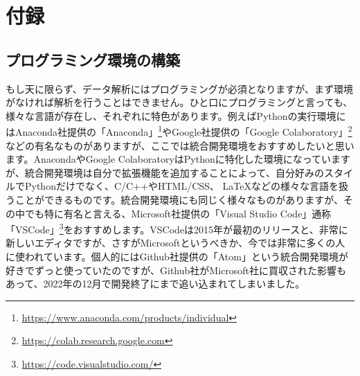 \chapter*{付録}
\label{chap:appendix}

\setcounter{section}{0} %
\renewcommand{\thesection}{\Alph{section}} %
\setcounter{equation}{0} %
\renewcommand{\theequation}{\Alph{section}.\arabic{equation}}
\setcounter{figure}{0} %
\renewcommand{\thefigure}{\Alph{section}.\arabic{figure}}
\setcounter{table}{0} %
\renewcommand{\thetable}{\Alph{section}.\arabic{table}}

\section{プログラミング環境の構築}
もし天に限らず、データ解析にはプログラミングが必須となりますが、まず環境がなければ解析を行うことはできません。ひと口にプログラミングと言っても、様々な言語が存在し、それぞれに特色があります。例えばPythonの実行環境にはAnaconda社提供の「Anaconda」\footnote{\url{https://www.anaconda.com/products/individual}}やGoogle社提供の「Google Colaboratory」\footnote{\url{https://colab.research.google.com}}などの有名なものがありますが、ここでは統合開発環境をおすすめしたいと思います。AnacondaやGoogle ColaboratoryはPythonに特化した環境になっていますが、統合開発環境は自分で拡張機能を追加することによって、自分好みのスタイルでPythonだけでなく、C/C++やHTML/CSS、 \LaTeX などの様々な言語を扱うことができるものです。統合開発環境にも同じく様々なものがありますが、その中でも特に有名と言える、Microsoft社提供の「Visual Studio Code」通称「VSCode」\footnote{\url{https://code.visualstudio.com/}}をおすすめします。VSCodeは2015年が最初のリリースと、非常に新しいエディタですが、さすがMicrosoftというべきか、今では非常に多くの人に使われています。個人的にはGithub社提供の「Atom」という統合開発環境が好きでずっと使っていたのですが、Github社がMicrosoft社に買収された影響もあって、2022年の12月で開発終了にまで追い込まれてしまいました。

